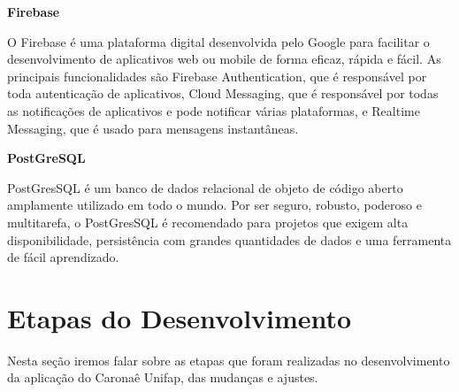 	\textbf{Firebase}
	
	O Firebase é uma plataforma digital desenvolvida pelo Google para facilitar o desenvolvimento de aplicativos web ou mobile de forma eficaz, rápida e fácil. As principais funcionalidades são Firebase Authentication, que é responsável por toda autenticação de aplicativos, Cloud Messaging, que é responsável por todas as notificações de aplicativos e pode notificar várias plataformas, e Realtime Messaging, que é usado para mensagens instantâneas.
	
	\textbf{PostGreSQL}
	
	PostGresSQL é um banco de dados relacional de objeto de código aberto amplamente utilizado em todo o mundo. Por ser seguro, robusto, poderoso e multitarefa, o PostGresSQL é recomendado para projetos que exigem alta disponibilidade, persistência com grandes quantidades de dados e uma ferramenta de fácil aprendizado.
	
	


\section{Etapas do Desenvolvimento}

Nesta seção iremos falar sobre as etapas que foram realizadas no desenvolvimento da aplicação do Caronaê Unifap, das mudanças e ajustes.

